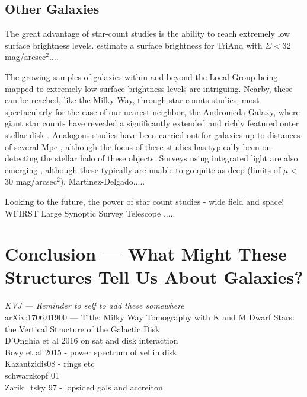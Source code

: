 \documentclass[galaxies,article,submit,moreauthors,pdftex,10pt,a4paper]{mdpi}
\begin{document}
\subsection{Other Galaxies}

The great advantage of star-count studies is the ability to reach extremely low surface brightness levels.
\cite{majewski04} estimate a surface brightness for TriAnd with $\Sigma <$32 mag/arcsec$^2$....

The growing samples of galaxies within and beyond the Local Group being mapped to extremely low surface brightness levels are intriguing.
Nearby, these can be reached, like the Milky Way, through star counts studies, most spectacularly for the case of our nearest neighbor, the Andromeda Galaxy, where giant star counts have revealed a significantly extended and richly featured outer stellar disk \citep{ferguson02,ibata05}.
Analogous studies have been carried out for galaxies up to distances of several Mpc \citep[e.g. the GHOSTS survey +???][]{}, although the focus of these studies has typically been on detecting the stellar halo of these objects.
Surveys using integrated light are also emerging \citep[e.g. Dragonfly and ATLAS3D][]{}, although these typically are unable to go quite as deep (limits of $\mu <$30 mag/arcsec$^2$).
Martinez-Delgado.....

Looking to the future, the power of star count studies - wide field and space! WFIRST
Large Synoptic Survey Telescope .....



\section{Conclusion --- What Might These Structures Tell Us About Galaxies?}

{\it KVJ --- Reminder to self to add these somewhere} \\
arXiv:1706.01900  --- Title: Milky Way Tomography with K and M Dwarf Stars: the Vertical Structure of
 the Galactic Disk \\
 D'Onghia et al 2016 on sat and disk interaction \\
 Bovy et al 2015 - power spectrum of vel in disk \\
 Kazantzidis08 - rings etc \\
 schwarzkopf 01 \\
 Zarik=tsky 97 - lopsided gals and accreiton
\end{document}
